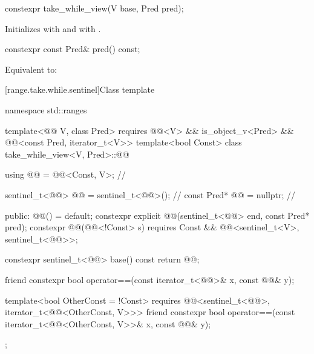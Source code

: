 %
\begin{itemdecl}
constexpr take_while_view(V base, Pred pred);
\end{itemdecl}

\begin{itemdescr}
\pnum
\effects
Initializes  with  and
 with .
\end{itemdescr}

%
\begin{itemdecl}
constexpr const Pred& pred() const;
\end{itemdecl}

\begin{itemdescr}
\pnum
\effects
Equivalent to: 
\end{itemdescr}

[range.take.while.sentinel]{Class template }

%
\begin{codeblock}
namespace std::ranges {
  template<@@ V, class Pred>
    requires @@<V> && is_object_v<Pred> &&
             @@<const Pred, iterator_t<V>>
  template<bool Const>
  class take_while_view<V, Pred>::@@ {
    using @@ = @@<Const, V>;                 // \expos

    sentinel_t<@@> @@ = sentinel_t<@@>();         // \expos
    const Pred* @@ = nullptr;                        // \expos

  public:
    @@() = default;
    constexpr explicit @@(sentinel_t<@@> end, const Pred* pred);
    constexpr @@(@@<!Const> s)
      requires Const && @@<sentinel_t<V>, sentinel_t<@@>>;

    constexpr sentinel_t<@@> base() const { return @@; }

    friend constexpr bool operator==(const iterator_t<@@>& x, const @@& y);

    template<bool OtherConst = !Const>
      requires @@<sentinel_t<@@>, iterator_t<@@<OtherConst, V>>>
    friend constexpr bool operator==(const iterator_t<@@<OtherConst, V>>& x,
                                     const @@& y);
  };
}
\end{codeblock}

